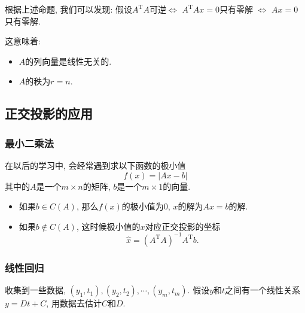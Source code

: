 根据上述命题, 我们可以发现: 假设$A^{\mathrm{T}}A$可逆$\iff$ $A^{\mathrm{T}}Ax = 0$只有零解 $\iff$ $Ax =0 $只有零解.

这意味着:
\begin{itemize}
    \item $A$的列向量是线性无关的.
    
    \item $A$的秩为$r = n$. 
\end{itemize}

\subsection{正交投影的应用}
\subsubsection{最小二乘法}
在以后的学习中, 会经常遇到求以下函数的极小值
\begin{equation}
  f(x) = \left| Ax - b \right|
\end{equation}
其中的$A$是一个$m \times n$的矩阵, $b$是一个$m \times 1$的向量.
\begin{itemize}
    \item 如果$b \in C(A)$, 那么$f(x)$的极小值为$0$, $x$的解为$A x = b$的解.
    \item 如果$b \notin C(A)$, 这时候极小值的$x$对应正交投影的坐标
    \begin{equation}
      \hat{x} = \left( A^{\mathrm{T}}A \right) ^{-1} A^{\mathrm{T}} b.
    \end{equation}
\end{itemize}

\subsubsection{线性回归}
收集到一些数据, $(y_1,t_1), (y_2,t_2) , \cdots, (y_m, t_m)$. 假设$y$和$t$之间有一个线性关系$y = Dt +C$, 用数据去估计$C$和$D$.

